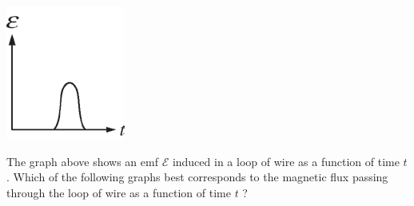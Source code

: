 \begin{center}
\includegraphics[scale=0.5]{images/img-009-023.png}
\end{center}

\begin{questions}\setcounter{question}{30}\question
The graph above shows an emf $\mathcal{E}$ induced in a loop of wire as a function of time $t$. Which of the following graphs best corresponds to the magnetic flux passing through the loop of wire as a function of time $t$ ?


\end{questions}
